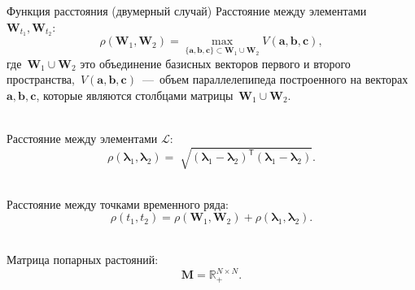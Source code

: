 \documentclass[10pt,pdf,hyperref={unicode}]{beamer}
\begin{document}
\begin{frame}[shrink=5]{Функция расстояния (двумерный случай)}
Расстояние между элементами~$\mathbf{W}_{t_1},\mathbf{W}_{t_2}$:\\
$$
\rho\left(\textbf{W}_1, \textbf{W}_2\right) = \max_{\{\textbf{a},\textbf{b},\textbf{c}\} \subset \textbf{W}_1\cup \textbf{W}_2 } V\left(\textbf{a},\textbf{b},\textbf{c}\right), 
$$
где~$\textbf{W}_1\cup\textbf{W}_2$ это объединение базисных векторов первого и второго пространства,~$V\left(\textbf{a},\textbf{b},\textbf{c}\right)$~---~объем параллелепипеда построенного на векторах~$\textbf{a}, \textbf{b}, \textbf{c}$, которые являются столбцами матрицы~$\textbf{W}_1\cup\textbf{W}_2$.

~\\
Расстояние между элементами $\mathcal{L}$:\\
$$
\rho\left(\bm{\lambda}_1, \bm{\lambda}_2\right) = \sqrt[]{\left(\bm{\lambda}_1 - \bm{\lambda}_2\right)^{\mathsf{T}}\left(\bm{\lambda}_1 - \bm{\lambda}_2\right)}.
$$

~\\
Расстояние между точками временного ряда:\\
$$
\rho\left(t_1, t_2\right) = \rho\left(\textbf{W}_1, \textbf{W}_2\right) + \rho\left(\bm{\lambda}_1, \bm{\lambda}_2\right).
$$

~\\
Матрица попарных растояний:\\
$$\textbf{M} = \mathbb{R}_{+}^{N\times N}.$$

\end{frame}
\end{document}
